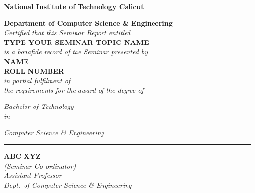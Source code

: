 \clearpage
\thispagestyle{empty}

\begin{center}

\Large \textbf{National Institute of Technology Calicut}\par
\large \textbf{Department of Computer Science \& Engineering}\\[1.0cm]

\emph{Certified that this Seminar Report entitled}\\[0.5cm]

\Huge \textbf{TYPE YOUR SEMINAR TOPIC NAME}\\[1.5cm]

\large \emph{is a bonafide record of the Seminar presented by}\\[1cm]

\normalsize \textbf{NAME
	\\ROLL NUMBER}\\[3.5cm]

\large \emph{in partial fulfilment of\\
	the requirements for the award of the degree of}

\Large \emph{Bachelor of Technology}\\
\small \emph{in}\par
\large \emph{Computer Science \& Engineering}

\vfill
\hrule
\vspace{2.0cm}

{\onehalfspacing
\large \textbf{ABC XYZ}\\

\small
\emph{
	(Seminar Co-ordinator)\\
	Assistant Professor\\
	Dept.\ of Computer Science \& Engineering}}

\end{center}
